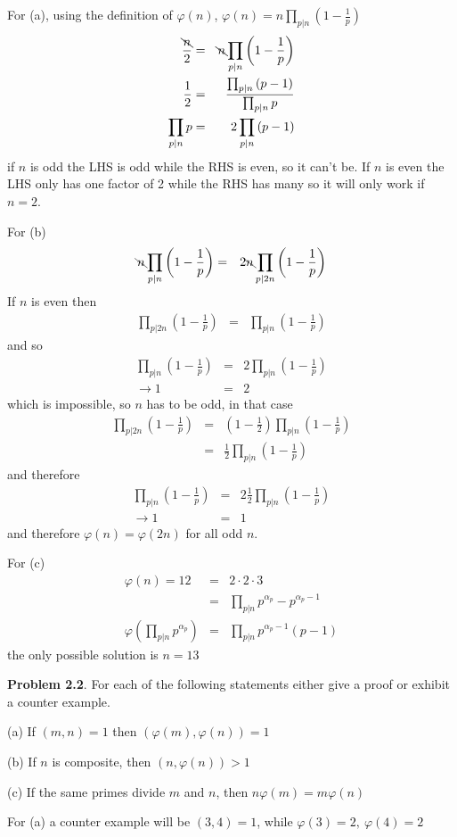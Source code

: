 \documentclass[aps,preprint,preprintnumbers,nofootinbib,showpacs,prd]{revtex4-1}
\newcommand{\nbea}{\begin{eqnarray*}}
\newcommand{\neea}{\end{eqnarray*}}
\begin{document}
For (a), using the definition of $\varphi(n)$, $\varphi(n) = n \prod_{p|n} \left ( 1 - \frac{1}{p} \right )$
%
\nbea
\frac{\bcancel{n}}{2} & = & \bcancel{n} \prod_{p|n} \left ( 1 - \frac{1}{p} \right ) \\
\frac{1}{2} & = & \frac{\prod_{p|n} \left ( p - 1 \right )}{\prod_{p|n} p} \\
\prod_{p|n} p & = & 2\prod_{p|n} \left ( p - 1 \right )
\neea
%
if $n$ is odd the LHS is odd while the RHS is even, so it can't be. If $n$ is even the LHS only has one factor of 2 while the RHS has many so it will only work if $n=2$.

For (b)
%
\nbea
\bcancel{n} \prod_{p|n} \left ( 1 - \frac{1}{p} \right )  & = & 2\bcancel{n} \prod_{p|2n} \left ( 1 - \frac{1}{p} \right )
\neea
%
If $n$ is even then
%
\nbea
\prod_{p|2n} \left ( 1 - \frac{1}{p} \right ) & = & \prod_{p|n} \left ( 1 - \frac{1}{p} \right )
\neea
%
and so
%
\nbea
\prod_{p|n} \left ( 1 - \frac{1}{p} \right )  & = & 2\prod_{p|n} \left ( 1 - \frac{1}{p} \right ) \\
\to 1 & = & 2
\neea
%
which is impossible, so $n$ has to be odd, in that case
%
\nbea
\prod_{p|2n} \left ( 1 - \frac{1}{p} \right ) & = & \left ( 1 - \frac{1}{2} \right ) \prod_{p|n} \left ( 1 - \frac{1}{p} \right ) \\
& = & \frac{1}{2} \prod_{p|n} \left ( 1 - \frac{1}{p} \right )
\neea
%
and therefore
%
\nbea
\prod_{p|n} \left ( 1 - \frac{1}{p} \right )  & = & 2 \frac{1}{2} \prod_{p|n} \left ( 1 - \frac{1}{p} \right ) \\
\to 1 & = & 1
\neea
%
and therefore $\varphi(n) = \varphi(2n)$ for all odd $n$.

For (c)
%
\nbea
\varphi(n) = 12 & = & 2 \cdot 2 \cdot 3 \\
& = & \prod_{p|n} p^{\alpha_p} - p^{\alpha_p-1} \\
\varphi\left (\prod_{p|n} p^{\alpha_p} \right ) & = & \prod_{p|n}p^{\alpha_p-1} (p - 1)
\neea
%
the only possible solution is $n=13$

{\bf Problem 2.2}. For each of the following statements either give a proof or exhibit a counter example.

(a) If $(m,n)=1$ then $(\varphi(m),\varphi(n)) = 1$

(b) If $n$ is composite, then $(n, \varphi(n)) > 1$

(c) If the same primes divide $m$ and $n$, then $n\varphi(m) = m\varphi(n)$

For (a) a counter example will be $(3,4) = 1$, while $\varphi(3) = 2, ~\varphi(4) = 2$
\end{document}
